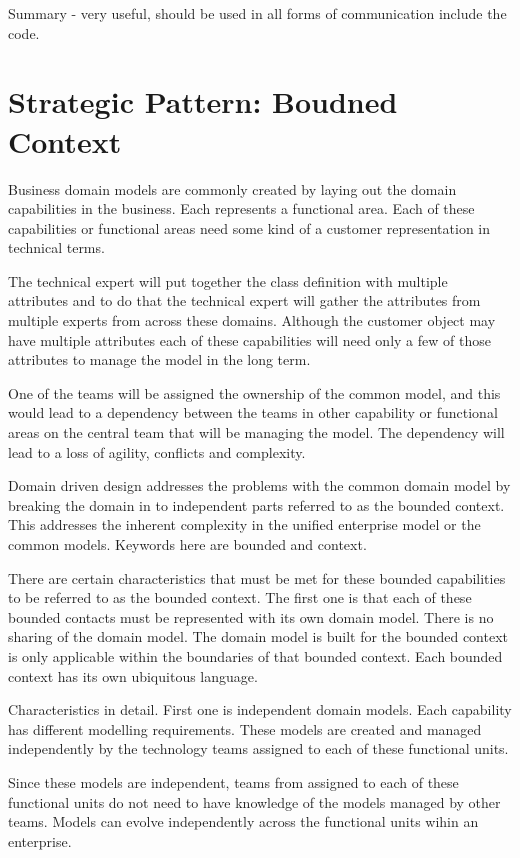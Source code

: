 \documentclass[a4paper, 11pt]{book}
\begin{document}
    Summary - very useful, should be used in all forms of communication include the code.


    \section{Strategic Pattern: Boudned Context}
    Business domain models are commonly created by laying out the domain capabilities in the business.
    Each represents a functional area.
    Each of these capabilities or functional areas need some kind of a customer representation in technical terms.

    The technical expert will put together the class definition with multiple attributes and to do that the technical expert will gather the attributes from multiple experts from across these domains.
    Although the customer object may have multiple attributes each of these capabilities will need only a few of those attributes to manage the model in the long term.

    One of the teams will be assigned the ownership of the common model, and this would lead to a dependency between the teams in other capability or functional areas on the central team that will be managing the model.
    The dependency will lead to a loss of agility, conflicts and complexity.

    Domain driven design addresses the problems with the common domain model by breaking the domain in to independent parts referred to as the bounded context.
    This addresses the inherent complexity in the unified enterprise model or the common models.
    Keywords here are bounded and context.

    There are certain characteristics that must be met for these bounded capabilities to be referred to as the bounded context.
    The first one is that each of these bounded contacts must be represented with its own domain model.
    There is no sharing of the domain model.
    The domain model is built for the bounded context is only applicable within the boundaries of that bounded context.
    Each bounded context has its own ubiquitous language.

    Characteristics in detail.
    First one is independent domain models.
    Each capability has different modelling requirements.
    These models are created and managed independently by the technology teams assigned to each of these functional units.

    Since these models are independent, teams from assigned to each of these functional units do not need to have knowledge of the models managed by other teams.
    Models can evolve independently across the functional units wihin an enterprise.
\end{document}
